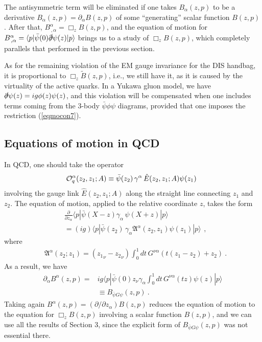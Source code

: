 \documentclass[final,5p,times,twocolumn]{elsarticle}
\newcommand{\nn}{\nonumber \\ }
\begin{document}
 The antisymmetric term will be eliminated 
if one takes   $B_\alpha (z,p) $   to be a derivative 
$B_\alpha (z,p) = \partial_\alpha B(z,p)$ of 
some ``generating'' scalar  function  $B(z,p)$.  After that, 
$B^{\alpha}_{\, ,\alpha}  = \Box_z  B(z,p) $, and the equation of 
motion for $B^{\alpha}_{\, ,\alpha}   = 
\langle  p | \bar \psi (0)\slashed \partial   \psi(z)  | p \rangle$  
brings us  to  a study of $\Box_z B(z,p)$,   which completely 
parallels that performed in the previous section.


As for the remaining violation of the EM gauge invariance  for the DIS handbag, 
it is proportional to $\Box_z \tilde B (z,p)$, i.e., 
 we still have it, as it is  
caused by  the virtuality of the active quarks.    In a Yukawa gluon model, 
we have $\slashed \partial   \psi(z) = i g \phi (z)  \psi(z)$, 
and this violation will be  compensated when one includes   terms coming from the 3-body 
$\bar \psi \phi \psi$  diagrams, provided that one imposes 
the restriction (\ref{eqmocon7}). 

\subsection{Equations of motion in QCD}

In QCD, one should take the operator 
\begin{align}
{\cal O}_q^\alpha  (z_2,z_1; A) \equiv \bar \psi (z_2) \,
 \gamma^\alpha \,  { \hat E} (z_2,z_1; A) \psi (z_1)  \  
\end{align}
involving the 
 gauge link   $ { \hat E} (z_2,z_1; A)$  along  the straight line connecting $z_1$ and $z_2$. 
The equation of motion,  applied to the relative coordinate $z$, takes the form 
 \begin{align}
  &  \frac{\partial}{\partial z_\alpha}  \langle p |    \bar \psi(X-z) \gamma_ \alpha  \,\psi (X+z)|p \rangle  
  \nonumber \\ &  = (ig)   \langle p |    \bar \psi(z_2) \,\gamma_\alpha  {\mathfrak A}^\alpha (z_2,z_1)   \psi (z_1)|p \rangle\,
  \ , 
\end{align} 
    where 
     \begin{align}
     &
          {\mathfrak A}^\alpha  (z_2;z_1)
        = 
     ({z_1}_\nu - {z_2}_\nu) 
    \int_0^1 dt \, G^{\nu \alpha} (t (z_1- z_2)+z_2) \  .
        \end{align} 
 As a result, we have
      \begin{align}
\partial_\alpha  B^\alpha (z,p) =     &ig \langle p | \bar \psi (0) 
     {z}_\nu \gamma_\alpha
    \int_0^1 dt \, G^{\nu \alpha} (t z) \psi (z) |p\rangle \nn & \equiv
    B_{\bar \psi G \psi} (z,p)  \  .
        \end{align} 
        Taking again $B^\alpha (z,p)= (\partial/\partial z_\alpha ) B(z,p)$  reduces the equation 
        of motion to the  equation for $\Box_z B (z,p)$ involving a scalar function $B (z,p)$,
        and   we can use all the results of Section 3, since the explicit form of $B_{\bar \psi G \psi} (z,p)$
        was not essential there. 
        
\end{document}
